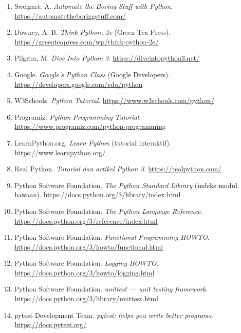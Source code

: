 \documentclass[12pt,a4paper]{article}
\begin{document}
\begin{enumerate}[leftmargin=*]
  \item Sweigart, A. \textit{Automate the Boring Stuff with Python}. \url{https://automatetheboringstuff.com/}

  \item Downey, A. B. \textit{Think Python, 2e} (Green Tea Press). \url{https://greenteapress.com/wp/think-python-2e/}

  \item Pilgrim, M. \textit{Dive Into Python 3}. \url{https://diveintopython3.net/}

  \item Google. \textit{Google's Python Class} (Google Developers). \url{https://developers.google.com/edu/python}

  \item W3Schools. \textit{Python Tutorial}. \url{https://www.w3schools.com/python/}

  \item Programiz. \textit{Python Programming Tutorial}. \url{https://www.programiz.com/python-programming}

  \item LearnPython.org. \textit{Learn Python} (tutorial interaktif). \url{https://www.learnpython.org/}

  \item Real Python. \textit{Tutorial dan artikel Python 3}. \url{https://realpython.com/}

  \item Python Software Foundation. \textit{The Python Standard Library} (indeks modul bawaan). \url{https://docs.python.org/3/library/index.html}

  \item Python Software Foundation. \textit{The Python Language Reference}. \url{https://docs.python.org/3/reference/index.html}

  \item Python Software Foundation. \textit{Functional Programming HOWTO}. \url{https://docs.python.org/3/howto/functional.html}

  \item Python Software Foundation. \textit{Logging HOWTO}. \url{https://docs.python.org/3/howto/logging.html}

  \item Python Software Foundation. \textit{unittest --- unit testing framework}. \url{https://docs.python.org/3/library/unittest.html}

  \item pytest Development Team. \textit{pytest: helps you write better programs}. \url{https://docs.pytest.org/}


\end{enumerate}
\end{document}
